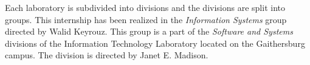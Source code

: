 Each laboratory is subdivided into divisions and the divisions are split into
groups. This internship has been realized in the \textit{Information Systems}
group directed by Walid Keyrouz. This group is a part of the \textit{Software
and Systems} divisions of the Information Technology Laboratory located on the
Gaithersburg campus. The division is directed by Janet E. Madison.
